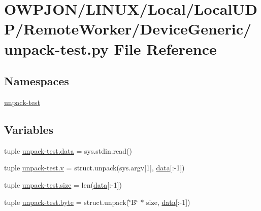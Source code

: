 \hypertarget{unpack-test_8py}{\section{O\-W\-P\-J\-O\-N/\-L\-I\-N\-U\-X/\-Local/\-Local\-U\-D\-P/\-Remote\-Worker/\-Device\-Generic/unpack-\/test.py File Reference}
\label{unpack-test_8py}
}
\subsection*{Namespaces}
\begin{DoxyCompactItemize}
\item 
\hyperlink{namespaceunpack-test}{unpack-\/test}
\end{DoxyCompactItemize}
\subsection*{Variables}
\begin{DoxyCompactItemize}
\item 
tuple \hyperlink{namespaceunpack-test_a3658f239ff3dd1c4b74ee01aa28503ae}{unpack-\/test.\-data} = sys.\-stdin.\-read()
\item 
tuple \hyperlink{namespaceunpack-test_a0b46ee9f8c169bb06c3f38266388decd}{unpack-\/test.\-v} = struct.\-unpack(sys.\-argv\mbox{[}1\mbox{]}, \hyperlink{blink6drcs_8c_abe49a82806b5db2e012bc33839af03e6}{data}\mbox{[}\-:-\/1\mbox{]})
\item 
tuple \hyperlink{namespaceunpack-test_a2bd26e3ecd1f57e05d13af8753da003c}{unpack-\/test.\-size} = len(\hyperlink{blink6drcs_8c_abe49a82806b5db2e012bc33839af03e6}{data}\mbox{[}\-:-\/1\mbox{]})
\item 
tuple \hyperlink{namespaceunpack-test_a055c4497265d0014aa3db51153f7bce7}{unpack-\/test.\-byte} = struct.\-unpack(\char`\"{}B\char`\"{} $\ast$ size, \hyperlink{blink6drcs_8c_abe49a82806b5db2e012bc33839af03e6}{data}\mbox{[}\-:-\/1\mbox{]})
\end{DoxyCompactItemize}
